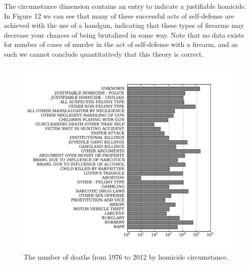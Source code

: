 \documentclass{evanarticle}
\begin{document}
The circumstance dimension contains an entry to indicate a justifiable homicide.  In Figure 12 we can see that many of these successful acts of self-defense are achieved with the use of a handgun, indicating that these types of firearms may decrease your chances of being brutalized in some way.  Note that no data exists for number of cases of murder in the act of self-defense with a firearm, and as such we cannot conclude quantitatively that this theory is correct.

\begin{figure}[H]
  \centering
    \includegraphics[width=\linewidth]{images/circumstance.pdf}
  \caption{The number of deaths from 1976 to 2012 by homicide circumstance.}
\end{figure}
\end{document}
